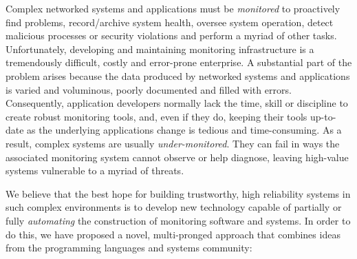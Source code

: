 

Complex networked systems and applications must be {\em monitored} to
proactively find problems, record/archive system health, oversee
system operation, detect malicious processes or security violations
and perform a myriad of other tasks.  
Unfortunately, developing and maintaining monitoring
infrastructure is a tremendously difficult, costly and error-prone
enterprise. A substantial part of the problem arises because
the data produced by networked systems and applications is
varied and voluminous, poorly documented and filled
with errors.  Consequently, application developers normally lack the time,
skill or discipline to create robust monitoring tools, and, even if they do,
keeping their tools up-to-date as the underlying applications change
is tedious and time-consuming.  As a
result, complex systems are usually {\em under-monitored}. They can
fail in ways the associated monitoring system cannot observe or help
diagnose, leaving high-value systems vulnerable to a myriad of threats.


We believe that the best hope for building trustworthy,
high reliability systems in such complex environments
is to develop new technology capable of partially or fully {\em automating}
the construction of monitoring software and systems.  In order to
do this, we have proposed a novel, multi-pronged approach that combines
ideas from the programming languages and systems community:

